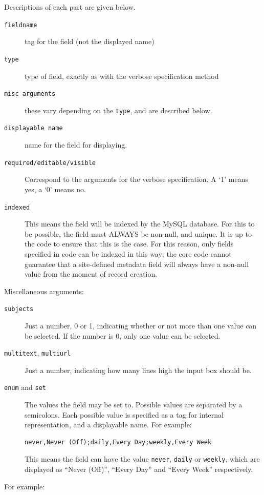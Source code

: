 Descriptions of each part are given below.

\begin{description}
\item[{\tt fieldname}] tag for the field (not the displayed name)
\item[{\tt type}] type of field, exactly as with the verbose specification method
\item[{\tt misc arguments}] these vary depending on the {\tt type}, and are described below.
\item[{\tt displayable name}] name for the field for displaying.
\item[{\tt required/editable/visible}] Correspond to the arguments for the verbose specification. A `1' means yes, a `0' means no.
\item[{\tt indexed}] This means the field will be indexed by the MySQL database. For this to be possible, the field must ALWAYS be non-null, and unique. It is up to the code to ensure that this is the case. For this reason, only fields specified in code can be indexed in this way; the core code cannot guarantee that a site-defined metadata field will always have a non-null value from the moment of record creation.
\end{description}

Miscellaneous arguments:

\begin{description}
\item[{\tt subjects}] Just a number, 0 or 1, indicating whether or not more than one value can be selected. If the number is 0, only one value can be selected.
\item[{\tt multitext}, {\tt multiurl}] Just a number, indicating how many lines high the input box should be.
\item[{\tt enum} and {\tt set}] The values the field may be set to. Possible values are separated by a semicolons. Each possible value is specified as a tag for internal representation, and a displayable name. For example:

\begin{verbatim}
never,Never (Off);daily,Every Day;weekly,Every Week
\end{verbatim}

This means the field can have the value {\tt never}, {\tt daily} or {\tt weekly}, which are displayed as ``Never (Off)'', ``Every Day'' and ``Every Week'' respectively.
\end{description}
 
For example:

